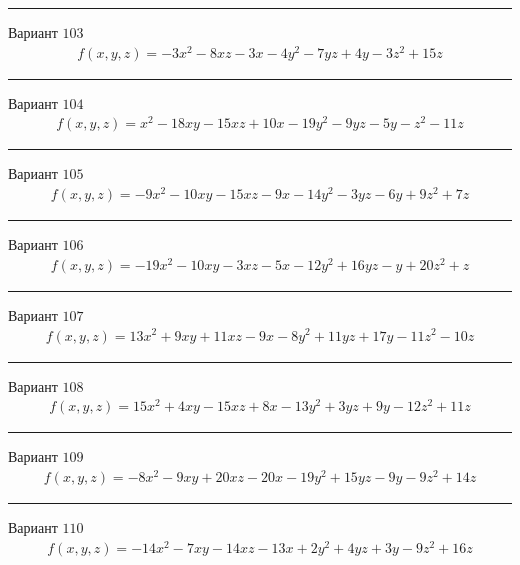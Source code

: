 \documentclass[11pt]{report}
\begin{document}
\begin{center}
\noindent\rule{8cm}{0.4pt}
\end{center}
Вариант $103$
\begin{align*}
    f(x, y, z) = - 3 x^{2} - 8 x z - 3 x - 4 y^{2} - 7 y z + 4 y - 3 z^{2} + 15 z
\end{align*}
\begin{center}
\noindent\rule{8cm}{0.4pt}
\end{center}
Вариант $104$
\begin{align*}
    f(x, y, z) = x^{2} - 18 x y - 15 x z + 10 x - 19 y^{2} - 9 y z - 5 y - z^{2} - 11 z
\end{align*}
\begin{center}
\noindent\rule{8cm}{0.4pt}
\end{center}
Вариант $105$
\begin{align*}
    f(x, y, z) = - 9 x^{2} - 10 x y - 15 x z - 9 x - 14 y^{2} - 3 y z - 6 y + 9 z^{2} + 7 z
\end{align*}
\begin{center}
\noindent\rule{8cm}{0.4pt}
\end{center}
Вариант $106$
\begin{align*}
    f(x, y, z) = - 19 x^{2} - 10 x y - 3 x z - 5 x - 12 y^{2} + 16 y z - y + 20 z^{2} + z
\end{align*}
\begin{center}
\noindent\rule{8cm}{0.4pt}
\end{center}
Вариант $107$
\begin{align*}
    f(x, y, z) = 13 x^{2} + 9 x y + 11 x z - 9 x - 8 y^{2} + 11 y z + 17 y - 11 z^{2} - 10 z
\end{align*}
\begin{center}
\noindent\rule{8cm}{0.4pt}
\end{center}
Вариант $108$
\begin{align*}
    f(x, y, z) = 15 x^{2} + 4 x y - 15 x z + 8 x - 13 y^{2} + 3 y z + 9 y - 12 z^{2} + 11 z
\end{align*}
\begin{center}
\noindent\rule{8cm}{0.4pt}
\end{center}
Вариант $109$
\begin{align*}
    f(x, y, z) = - 8 x^{2} - 9 x y + 20 x z - 20 x - 19 y^{2} + 15 y z - 9 y - 9 z^{2} + 14 z
\end{align*}
\begin{center}
\noindent\rule{8cm}{0.4pt}
\end{center}
Вариант $110$
\begin{align*}
    f(x, y, z) = - 14 x^{2} - 7 x y - 14 x z - 13 x + 2 y^{2} + 4 y z + 3 y - 9 z^{2} + 16 z
\end{align*}
\end{document}

